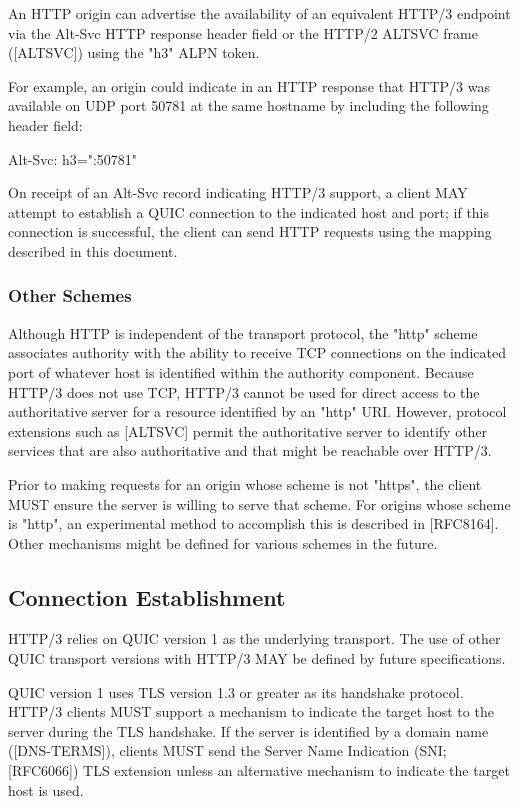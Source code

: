 \documentclass{article}
\begin{document}
An HTTP origin can advertise the availability of an equivalent HTTP/3 endpoint via the Alt-Svc HTTP response header field or the HTTP/2 ALTSVC frame ([ALTSVC]) using the "h3" ALPN token.

For example, an origin could indicate in an HTTP response that HTTP/3 was available on UDP port 50781 at the same hostname by including the following header field:

Alt-Svc: h3=":50781"

On receipt of an Alt-Svc record indicating HTTP/3 support, a client MAY attempt to establish a QUIC connection to the indicated host and port; if this connection is successful, the client can send HTTP requests using the mapping described in this document.

\subsubsection{Other Schemes}

Although HTTP is independent of the transport protocol, the "http" scheme associates authority with the ability to receive TCP connections on the indicated port of whatever host is identified within the authority component.  Because HTTP/3 does not use TCP, HTTP/3 cannot be used for direct access to the authoritative server for a resource identified by an "http" URI.  However, protocol extensions such as [ALTSVC] permit the authoritative server to identify other services that are also authoritative and that might be reachable over HTTP/3.

Prior to making requests for an origin whose scheme is not "https", the client MUST ensure the server is willing to serve that scheme. For origins whose scheme is "http", an experimental method to accomplish this is described in [RFC8164].  Other mechanisms might be defined for various schemes in the future.

\subsection{Connection Establishment}

HTTP/3 relies on QUIC version 1 as the underlying transport.  The use of other QUIC transport versions with HTTP/3 MAY be defined by future specifications.

QUIC version 1 uses TLS version 1.3 or greater as its handshake protocol.  HTTP/3 clients MUST support a mechanism to indicate the target host to the server during the TLS handshake.  If the server is identified by a domain name ([DNS-TERMS]), clients MUST send the Server Name Indication (SNI; [RFC6066]) TLS extension unless an alternative mechanism to indicate the target host is used.
\end{document}
